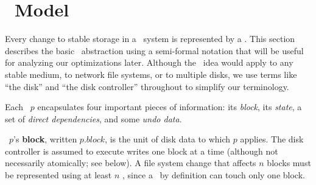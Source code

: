 
\section{\Patch\ Model}
\label{sec:patch}

\makeatletter
\let\emptyset\varnothing
\newcommand{\PState}[1]{\ensuremath{#1.\textit{state}}}
\newcommand{\PBlock}[1]{\ensuremath{#1.\textit{block}}}
\newcommand{\PMemst}{\ensuremath{\textit{mem}}}
\newcommand{\PInfst}{\ensuremath{\textit{flight}}}
\newcommand{\PDiskst}{\ensuremath{\textit{disk}}}
\newcommand{\PSetlim}[1]{\def\@next{#1}\ifx\@next\@empty\else[\@next]\fi}
\newcommand{\PMem}[1][]{\ensuremath{\textit{Mem}\PSetlim{#1}}}
\newcommand{\PInf}[1][]{\ensuremath{\textit{Flight}\PSetlim{#1}}}
\newcommand{\PDisk}[1][]{\ensuremath{\textit{Disk}\PSetlim{#1}}}
\newcommand{\PHard}[1][]{\ensuremath{\textit{\Nrb}\PSetlim{#1}}}
\newcommand{\PSoft}[1][]{\ensuremath{\textit{\Rb}\PSetlim{#1}}}
\newcommand{\PEmpty}[1][]{\ensuremath{\textit{\Noop}\PSetlim{#1}}}
\newcommand{\PDDepset}[1]{\ensuremath{\def\@next{#1}\ifx\@next\@empty\else\@next.\fi\textit{ddeps}}}
\newcommand{\PDepend}{\ensuremath{\leadsto}}
\newcommand{\PDDepend}{\ensuremath{\rightarrow}}
\newcommand{\PDepset}[1]{\ensuremath{\textit{Dep}[#1]}}
\newcommand{\PRDepset}[1]{\ensuremath{\textit{RDep}[#1]}}
\makeatother

Every change to stable storage in a \Kudos\ system is represented by a
\emph{\patch}.
%
This section describes the basic \patch\ abstraction using a semi-formal
notation that will be useful for analyzing our optimizations later.
%
Although the \patch\ idea would apply to any stable medium, to network file
systems, or to multiple disks, we use terms like ``the disk'' and ``the
disk controller'' throughout to simplify our terminology.


Each \patch\ $p$ encapsulates four important pieces of information: its
 \emph{block}, its \emph{state}, a set of \emph{direct dependencies}, and
 some \emph{undo data}.

\Patch\ $p$'s \textbf{block}, written $\PBlock{p}$, is the unit of disk data
 to which $p$ applies.  The disk controller is assumed to execute writes one
 block at a time (although not necessarily atomically; see below).  A file system
 change that affects $n$ blocks must be represented using at least $n$
 \patches, since a \patch\ by definition can touch only one block.

